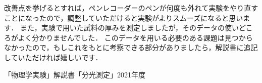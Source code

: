 \documentclass[titlepage]{jsarticle}
\begin{document}
改善点を挙げるとすれば，ペンレコーダーのペンが何度も外れて実験をやり直すことになったので，調整していただけると実験がよりスムーズになると思います．
また，実験で用いた試料の厚みを測定しましたが，そのデータの使いどころがよく分かりませんでした．
このデータを用いる必要のある課題は見つからなかったので，もしこれをもとに考察できる部分がありましたら，解説書に追記していただければ嬉しいです．

\begin{thebibliography}{99}
    「物理学実験」解説書「分光測定」2021年度
\end{thebibliography}
\end{document}
